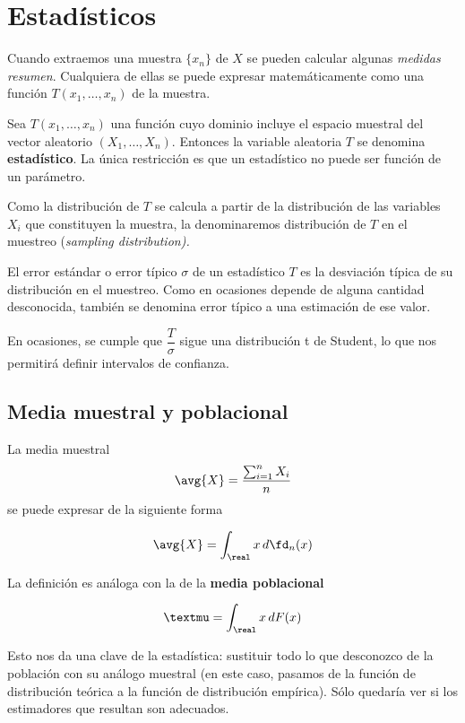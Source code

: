 \documentclass{apuntes}
\begin{document}
\section{Estadísticos}

Cuando extraemos una muestra $\{x_n\}$ de $X$ se pueden calcular algunas \textit{medidas resumen}. Cualquiera de ellas se puede expresar matemáticamente como una función $T(x_1,\dotsc,x_n)$ de la muestra. 

\begin{defn}[Estadístico]
Sea $T(x_1,\dotsc,x_n)$ una función cuyo dominio incluye el espacio muestral del vector aleatorio $(X_1, \dotsc, X_n)$. Entonces la variable aleatoria $T$ se denomina \textbf{estadístico}. La única restricción es que un estadístico no puede ser función de un parámetro.
\end{defn}

Como la distribución de $T$ se calcula a partir de la distribución de las variables $X_i$ que constituyen la muestra, la denominaremos distribución de $T$ en el muestreo (\textit{sampling distribution).}

\begin{defn}
El error estándar o error típico $\sigma$ de un estadístico $T$ es la desviación típica de su distribución en el muestreo. Como en ocasiones depende de alguna cantidad desconocida, también se denomina error típico a una estimación de ese valor.
\end{defn}

En ocasiones, se cumple que $\dfrac{T}{\sigma}$ sigue una distribución t de Student, lo que nos permitirá definir intervalos de confianza.

\subsection{Media muestral y poblacional}

\begin{defn} La media muestral \[ \avg{X} = \frac{\sum_{i=1}^n X_i}{n} \] se puede expresar de la siguiente forma

\[ \avg{X} = \int_\real x\,d\fd_n(x) \]
\end{defn}

La definición es análoga con la de la \textbf{media poblacional}

\[ µ = \int_\real x \,dF(x) \]

Esto nos da una clave de la estadística: sustituir todo lo que desconozco de la población con su análogo muestral (en este caso, pasamos de la función de distribución teórica a la función de distribución empírica). Sólo quedaría ver si los estimadores que resultan son adecuados.
\end{document}
